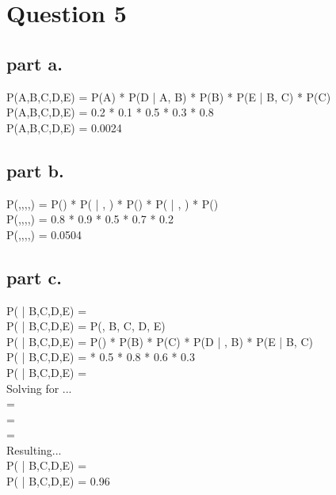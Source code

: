\section{Question 5}

\subsection{part a.}

P(A,B,C,D,E) = P(A) * P(D | A, B) * P(B) * P(E | B, C) * P(C) \\
P(A,B,C,D,E) = 0.2 * 0.1 * 0.5 * 0.3 * 0.8 \\
P(A,B,C,D,E) = 0.0024\\

\subsection{part b.}

P(,,,,) = P() * P( | , ) * P() * P( | , ) * P() \\
P(,,,,) = 0.8 * 0.9 * 0.5 * 0.7 * 0.2 \\
P(,,,,) = 0.0504 \\

\subsection{part c.}


P( | B,C,D,E) =  \\
P( | B,C,D,E) = \alpha P(, B, C, D, E) \\
P( | B,C,D,E) = \alpha P() * P(B) * P(C) * P(D | , B) * P(E | B, C) \\
P( | B,C,D,E) =  * 0.5 * 0.8 * 0.6 * 0.3 \\
P( | B,C,D,E) =  \\

\newpage
Solving for \alpha ... \\
\alpha =  \\
\alpha =  \\
\alpha =  \\

Resulting...\\
P( | B,C,D,E) =   \\
P( | B,C,D,E) = 0.96
